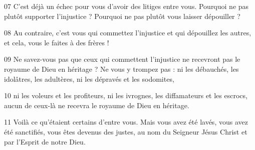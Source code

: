 
07 C’est déjà un échec pour vous d’avoir des litiges entre vous. Pourquoi ne pas plutôt supporter l’injustice ? Pourquoi ne pas plutôt vous laisser dépouiller ?

08 Au contraire, c’est vous qui commettez l’injustice et qui dépouillez les autres, et cela, vous le faites à des frères !

09 Ne savez-vous pas que ceux qui commettent l’injustice ne recevront pas le royaume de Dieu en héritage ? Ne vous y trompez pas : ni les débauchés, les idolâtres, les adultères, ni les dépravés et les sodomites,

10 ni les voleurs et les profiteurs, ni les ivrognes, les diffamateurs et les escrocs, aucun de ceux-là ne recevra le royaume de Dieu en héritage.

11 Voilà ce qu’étaient certains d’entre vous. Mais vous avez été lavés, vous avez été sanctifiés, vous êtes devenus des justes, au nom du Seigneur Jésus Christ et par l’Esprit de notre Dieu.
